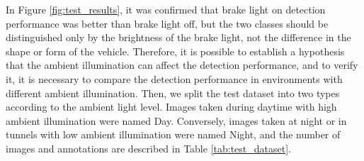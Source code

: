 In Figure \ref{fig:test_results}, it was confirmed that brake light on detection performance was better than brake light off, but the two classes should be distinguished only by the brightness of the brake light, not the difference in the shape or form of the vehicle. 
Therefore, it is possible to establish a hypothesis that the ambient illumination can affect the detection performance, and to verify it, it is necessary to compare the detection performance in environments with different ambient illumination.
Then, we split the test dataset into two types according to the ambient light level. 
Images taken during daytime with high ambient illumination were named Day. 
Conversely, images taken at night or in tunnels with low ambient illumination were named Night, and the number of images and annotations are described in Table \ref{tab:test_dataset}.

